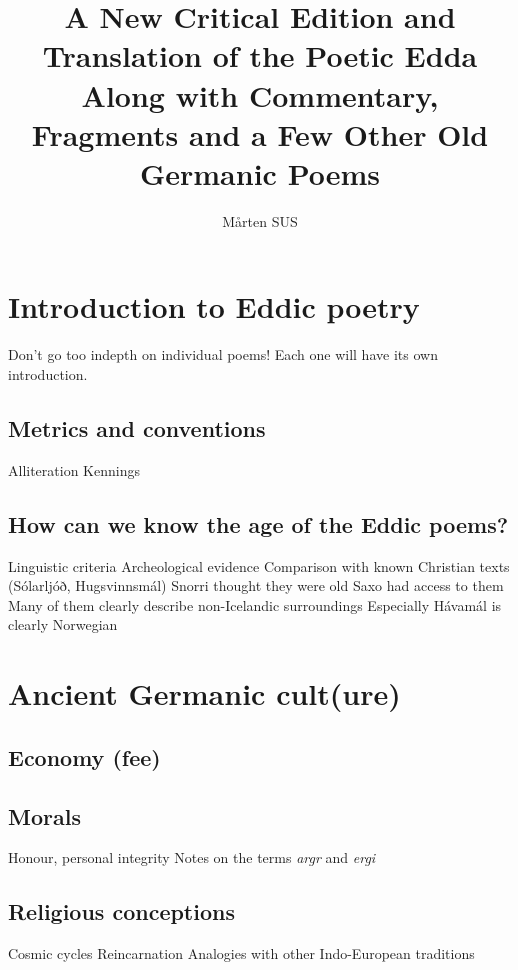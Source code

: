 \title{%
  A New Critical Edition and Translation of the Poetic Edda \\
  \large Along with Commentary, Fragments and a Few Other Old Germanic Poems}

\author{Mårten SUS}

\maketitle

\newpage


\tableofcontents

\chapter{Introduction to Eddic poetry}
  Don't go too indepth on individual poems! Each one will have its own introduction.
  \section{Metrics and conventions}
    Alliteration
    Kennings
  \section{How can we know the age of the Eddic poems?}
    Linguistic criteria
    Archeological evidence
    Comparison with known Christian texts (Sólarljóð, Hugsvinnsmál)
    Snorri thought they were old
    Saxo had access to them
    Many of them clearly describe non-Icelandic surroundings
      Especially Hávamál is clearly Norwegian

\chapter{Ancient Germanic cult(ure)}
  \section{Economy (fee)}
  \section{Morals}
    Honour, personal integrity
    Notes on the terms \emph{argr} and \emph{ergi}
  \section{Religious conceptions}
    Cosmic cycles
    Reincarnation
    Analogies with other Indo-European traditions

